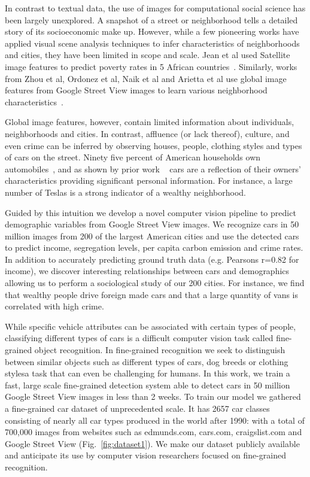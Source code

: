 \documentclass[letterpaper]{article}
\begin{document}
In contrast to textual data, the use of images for computational social science has been largely unexplored. A snapshot of a street or neighborhood tells a detailed story of its socioeconomic make up. However, while a few pioneering works have applied visual scene analysis techniques to infer characteristics of neighborhoods and cities, they have been limited in scope and scale. Jean et al used Satellite image features to predict poverty rates in 5 African countries~\cite{neal}. Similarly, works from Zhou et al, Ordonez et al, Naik et al and Arietta et al use global image features from Google Street View images to learn various neighborhood characteristics~\cite{antonio,tamara,mit_cvpr,alyosha}.

Global image features, however, contain limited information about individuals, neighborhoods and cities. In contrast, affluence (or lack thereof), culture, and even crime can be inferred by observing houses, people, clothing styles and types of cars on the street. Ninety five percent of American households own automobiles~\cite{car_stats}, and as shown by prior work ~\cite{car_personality} cars are a reflection of their owners' characteristics providing significant personal information. For instance, a large number of Teslas is a strong indicator of a wealthy neighborhood.

Guided by this intuition we develop a novel computer vision pipeline to predict demographic variables from Google Street View images. We recognize cars in 50 million images from 200 of the largest American cities and use the detected cars to predict  income, segregation levels, per capita carbon emission and crime rates. In addition to accurately predicting ground truth data (e.g. Pearsons r=0.82 for income), we discover interesting relationships between cars and demographics allowing us to perform a sociological study of our 200 cities. For instance, we find that wealthy people drive foreign made cars and that a large quantity of vans is correlated with high crime.

While specific vehicle attributes can be associated with certain types of people, classifying different types of cars is a difficult computer vision task called fine-grained object recognition. In fine-grained recognition we seek to distinguish between similar objects such as different types of cars, dog breeds or clothing styles\textemdash a task that can even be challenging for humans. In this work, we train a fast, large scale fine-grained detection system able to detect cars in 50 million Google Street View images in less than 2 weeks. To train our model we gathered a fine-grained car dataset of unprecedented scale. It has 2657 car classes consisting of nearly all car types produced in the world after 1990: with a total of 700,000 images from websites such as edmunds.com, cars.com, craigslist.com and Google Street View (Fig.~\ref{fig:dataset1}). We make our dataset publicly available and anticipate its use by computer vision researchers focused on fine-grained recognition.
\end{document}
